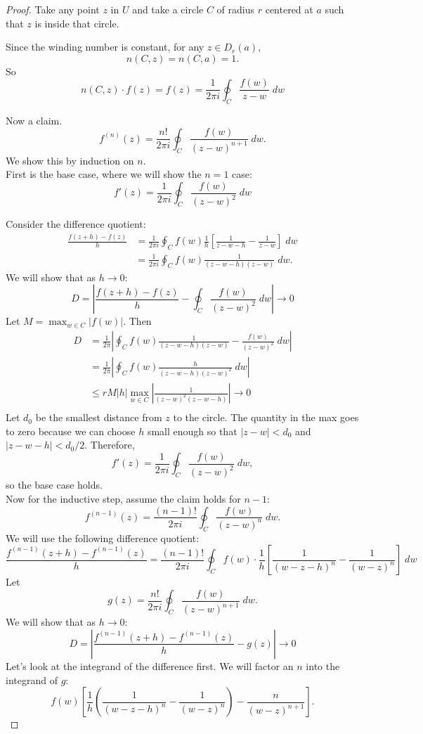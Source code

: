 \documentclass[notes]{subfile}
\begin{document}
\begin{proof}
    Take any point $z$ in $U$ and take a circle $C$ of radius $r$ centered at $a$
    such that $z$ is inside that circle.
    
    Since the winding number is constant, for any $z \in D_r (a)$,
    \[ n(C, z) = n(C, a) = 1. \]
    So
    \[ n(C,z) \cdot f(z) = f(z) = \frac{1}{2\pi i} 
    \oint_{C} \frac{f(w)}{z-w} \; dw \]

    Now a claim.
    \[ f^{(n)} (z) = \frac{n!}{2\pi i} \oint_{C} \frac{f(w)}{(z-w)^{n+1}} \; dw. \]
    We show this by induction on $n$. \\

    First is the base case, where we will show the $n=1$ case:
    \[ f'(z) = \frac{1}{2 \pi i} \oint_C \frac{f(w)}{(z-w)^2} \; dw \]

    Consider the difference quotient:
    \begin{align*}
        \frac{f(z+h) - f(z)}{h} &= 
    \frac{1}{2\pi i} \oint_C f(w) \frac{1}{h} \left[ \frac{1}{z-w-h} - \frac{1}{z-w} \right] \; dw \\
        &= \frac{1}{2\pi i} \oint_C f(w) \frac{1}{(z-w-h)(z-w)} \; dw.
    \end{align*}
    We will show that as $h \to 0$:
    \[D = \left| \frac{f(z+h) - f(z)}{h} -\oint_C \frac{f(w)}{(z-w)^2} \; dw \right| \to 0\]
    Let $M = \max_{w \in C} |f(w)|$. Then
    \begin{align*}
        D &= \frac{1}{2\pi} \left| \oint_C f(w) \frac{1}{(z-w-h)(z-w)} - \frac{f(w)}{(z-w)^2} \; dw \right| \\
        &= \frac{1}{2\pi} \left| \oint_C f(w) \frac{h}{(z-w-h)(z-w)^2} \; dw \right| \\
        &\le rM |h| \max_{w \in C} \left| \frac{1}{(z-w)^2(z-w-h)} \right| \to 0 \tag{ML Theorem} \\
    \end{align*}
    Let $d_0$ be the smallest distance from $z$ to the circle.
    The quantity in the max goes to zero because we can choose $h$ small enough so that $|z-w| < d_0$ and $|z-w-h| < d_0/2$.
    Therefore,
    \[ f'(z) = \frac{1}{2 \pi i} \oint_C \frac{f(w)}{(z-w)^2} \; dw, \]
    so the base case holds. \\

    Now for the inductive step, assume the claim holds for $n-1$:
    \[ f^{(n-1)} (z) = \frac{(n-1)!}{2\pi i} 
    \oint_C \frac{f(w)}{(z-w)^n} \; dw. \]
    We will use the following difference quotient:
    \[ \frac{f^{(n-1)}(z+h) - f^{(n-1)}(z)}{h} = 
        \frac{(n-1)!}{2\pi i} \oint_C f(w) \cdot \frac{1}{h}
    \left[ \frac{1}{(w-z-h)^n} - \frac{1}{(w-z)^n} \right] \; dw \]
    Let 
    \[g(z) = \frac{n!}{2\pi i}\oint_C \frac{f(w)}{(z-w)^{n+1}} \; dw. \]
    We will show that as $h \to 0$:
    \[ D = \left| \frac{f^{(n-1)}(z+h) - f^{(n-1)}(z)}{h} - g(z)
    \right| \to 0 \]
    Let's look at the integrand of the difference first.
    We will factor an $n$ into the integrand of $g$:
    \[ f(w) \left[ \frac{1}{h} \left( \frac{1}{(w-z-h)^n} - \frac{1}{(w-z)^n}\right) - \frac{n}{(w-z)^{n+1}} \right]. \]


\end{proof}
\end{document}
